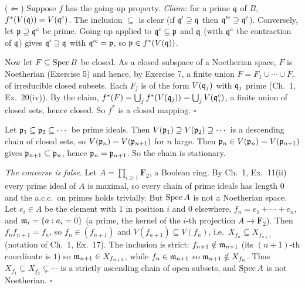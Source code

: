 \documentclass[11pt]{article}
\begin{document}
($\Leftarrow$) Suppose $f$ has the going-up property. \emph{Claim:} for a prime $\mathfrak q$ of $B$, $f^*(V(\mathfrak q))=V(\mathfrak q^c)$. The inclusion $\subseteq$ is clear (if $\mathfrak q'\supseteq\mathfrak q$ then $\mathfrak q'^c\supseteq\mathfrak q^c$). Conversely, let $\mathfrak p\supseteq\mathfrak q^c$ be prime. Going-up applied to $\mathfrak q^c\subseteq\mathfrak p$ and $\mathfrak q$ (with $\mathfrak q^c$ the contraction of $\mathfrak q$) gives $\mathfrak q'\supseteq\mathfrak q$ with $\mathfrak q'^c=\mathfrak p$, so $\mathfrak p\in f^*(V(\mathfrak q))$.

Now let $F\subseteq\operatorname{Spec} B$ be closed. As a closed subspace of a Noetherian space, $F$ is Noetherian (Exercise 5) and hence, by Exercise 7, a finite union $F=F_1\cup\cdots\cup F_r$ of irreducible closed subsets. Each $F_j$ is of the form $V(\mathfrak q_j)$ with $\mathfrak q_j$ prime (Ch.~1, Ex.~20(iv)). By the claim, $f^*(F)=\bigcup_jf^*(V(\mathfrak q_j))=\bigcup_jV(\mathfrak q_j^c)$, a finite union of closed sets, hence closed. So $f^*$ is a closed mapping. \hfill$\square$

\pf
Let $\mathfrak p_1\subseteq\mathfrak p_2\subseteq\cdots$ be prime ideals. Then $V(\mathfrak p_1)\supseteq V(\mathfrak p_2)\supseteq\cdots$ is a descending chain of closed sets, so $V(\mathfrak p_n)=V(\mathfrak p_{n+1})$ for $n$ large. Then $\mathfrak p_n\in V(\mathfrak p_n)=V(\mathfrak p_{n+1})$ gives $\mathfrak p_{n+1}\subseteq\mathfrak p_n$, hence $\mathfrak p_n=\mathfrak p_{n+1}$. So the chain is stationary.

\emph{The converse is false.} Let $A=\prod_{i\ge1}\mathbf F_2$, a Boolean ring. By Ch.~1, Ex.~11(ii) every prime ideal of $A$ is maximal, so every chain of prime ideals has length $0$ and the a.c.c.\ on primes holds trivially. But $\operatorname{Spec} A$ is not a Noetherian space. Let $e_i\in A$ be the element with $1$ in position $i$ and $0$ elsewhere, $f_n=e_1+\cdots+e_n$, and $\mathfrak m_i=\{a:a_i=0\}$ (a prime, the kernel of the $i$-th projection $A\to\mathbf F_2$). Then $f_nf_{n+1}=f_n$, so $f_n\in(f_{n+1})$ and $V(f_{n+1})\subseteq V(f_n)$, i.e.\ $X_{f_n}\subseteq X_{f_{n+1}}$ (notation of Ch.~1, Ex.~17). The inclusion is strict: $f_{n+1}\notin\mathfrak m_{n+1}$ (its $(n{+}1)$-th coordinate is $1$) so $\mathfrak m_{n+1}\in X_{f_{n+1}}$, while $f_n\in\mathfrak m_{n+1}$ so $\mathfrak m_{n+1}\notin X_{f_n}$. Thus $X_{f_1}\subsetneq X_{f_2}\subsetneq\cdots$ is a strictly ascending chain of open subsets, and $\operatorname{Spec} A$ is not Noetherian. \hfill$\square$
\end{document}
